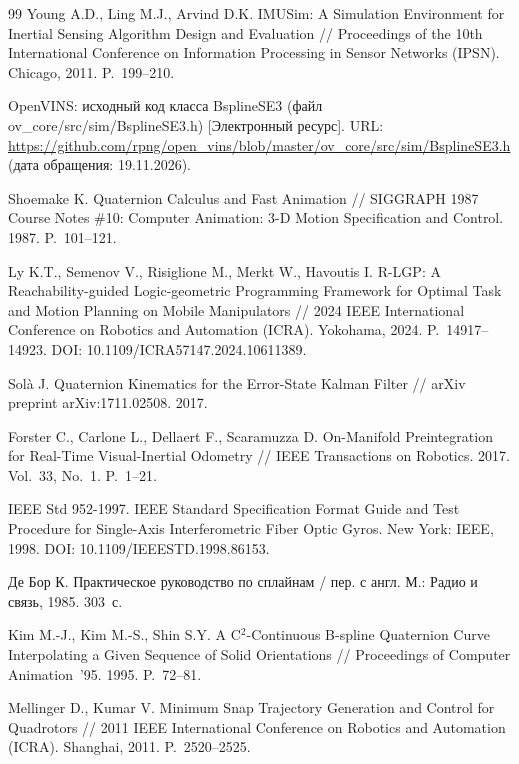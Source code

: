 \documentclass{misisarticle}
\begin{document}
\begin{thebibliography}{99}
 Young A.D., Ling M.J., Arvind D.K. IMUSim: A Simulation Environment for Inertial Sensing Algorithm Design and Evaluation // Proceedings of the 10th International Conference on Information Processing in Sensor Networks (IPSN). Chicago, 2011. P.~199--210.

 OpenVINS: исходный код класса BsplineSE3 (файл ov\_core/src/sim/BsplineSE3.h) [Электронный ресурс]. URL: \url{https://github.com/rpng/open_vins/blob/master/ov_core/src/sim/BsplineSE3.h} (дата обращения: 19.11.2026).

 Shoemake K. Quaternion Calculus and Fast Animation // SIGGRAPH 1987 Course Notes \#10: Computer Animation: 3-D Motion Specification and Control. 1987. P.~101--121.

 Ly K.T., Semenov V., Risiglione M., Merkt W., Havoutis I. R-LGP: A Reachability-guided Logic-geometric Programming Framework for Optimal Task and Motion Planning on Mobile Manipulators // 2024 IEEE International Conference on Robotics and Automation (ICRA). Yokohama, 2024. P.~14917--14923. DOI: 10.1109/ICRA57147.2024.10611389.

 Solà J. Quaternion Kinematics for the Error-State Kalman Filter // arXiv preprint arXiv:1711.02508. 2017.

 Forster C., Carlone L., Dellaert F., Scaramuzza D. On-Manifold Preintegration for Real-Time Visual-Inertial Odometry // IEEE Transactions on Robotics. 2017. Vol.~33, No.~1. P.~1--21.

 IEEE Std 952-1997. IEEE Standard Specification Format Guide and Test Procedure for Single-Axis Interferometric Fiber Optic Gyros. New York: IEEE, 1998. DOI: 10.1109/IEEESTD.1998.86153.

 Де Бор К. Практическое руководство по сплайнам / пер. с англ. М.: Радио и связь, 1985. 303~с.

 Kim M.-J., Kim M.-S., Shin S.Y. A C$^2$-Continuous B-spline Quaternion Curve Interpolating a Given Sequence of Solid Orientations // Proceedings of Computer Animation~'95. 1995. P.~72--81.

 Mellinger D., Kumar V. Minimum Snap Trajectory Generation and Control for Quadrotors // 2011 IEEE International Conference on Robotics and Automation (ICRA). Shanghai, 2011. P.~2520--2525.

\end{thebibliography}
\end{document}
